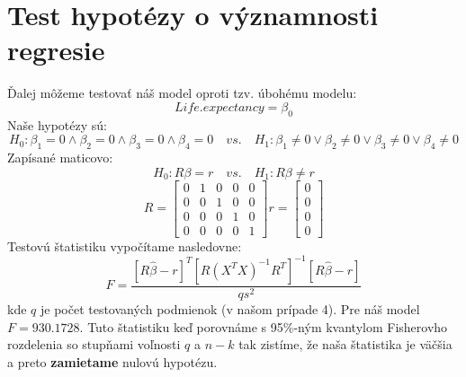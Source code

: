\section*{Test hypotézy o významnosti regresie}
Ďalej môžeme testovať náš model oproti tzv. úbohému modelu:
\[
    Life.expectancy = \beta_0
\]
Naše hypotézy sú:
\[
H_0: \beta_1=0\land\beta_2=0\land\beta_3=0\land\beta_4=0 \quad vs. \quad H_1: \beta_1\ne0\lor\beta_2\ne0\lor\beta_3\ne0\lor\beta_4\ne0
\]
Zapísané maticovo:
\[
    H_0: R\beta = r \quad vs. \quad H_1: R\beta \ne r
\]
\[
    R = \begin{bmatrix}
        0 & 1 & 0 & 0 & 0\\
        0 & 0 & 1 & 0 & 0\\
        0 & 0 & 0 & 1 & 0\\
        0 & 0 & 0 & 0 & 1
        \end{bmatrix}
    r = \begin{bmatrix}
        0 \\
        0 \\
        0 \\
        0 
        \end{bmatrix}
\]
Testovú štatistiku vypočítame nasledovne:
\[
    F = \frac{[R\hat{\beta}-r]^T[R(X^TX)^{-1}R^T]^{-1}[R\hat{\beta}-r]}{qs^2}
\]
kde $q$ je počet testovaných podmienok (v našom prípade 4). Pre náš model $F=930.1728$.
Tuto štatistiku keď porovnáme s 95\%-ným kvantylom Fisherovho rozdelenia so stupňami voľnosti $q$ a $n-k$ tak zistíme,
že naša štatistika je väčšia a preto \textbf{zamietame} nulovú hypotézu.

